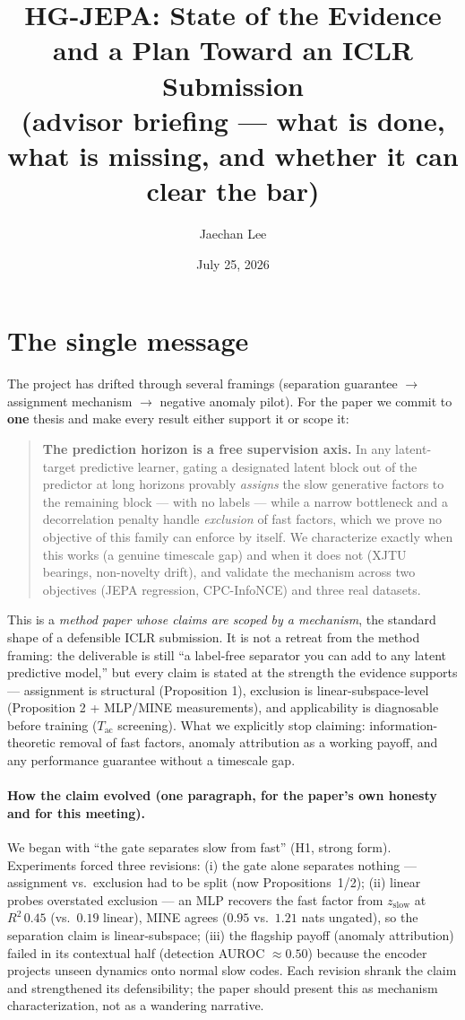 \documentclass[10pt]{article}
\title{\vspace{-8mm}\large\bf HG-JEPA: State of the Evidence and a Plan Toward an
ICLR Submission\\ \normalsize (advisor briefing --- what is done, what is missing,
and whether it can clear the bar)}
\author{Jaechan Lee}
\date{July 25, 2026}
\newcommand{\zslow}{z_{\mathrm{slow}}}
\begin{document}
\maketitle
\vspace{-6mm}

\section{The single message}
The project has drifted through several framings (separation guarantee
$\to$ assignment mechanism $\to$ negative anomaly pilot). For the paper we
commit to \textbf{one} thesis and make every result either support it or
scope it:

\begin{quote}
\textbf{The prediction horizon is a free supervision axis.} In any
latent-target predictive learner, gating a designated latent block out of the
predictor at long horizons provably \emph{assigns} the slow generative
factors to the remaining block --- with no labels --- while a narrow
bottleneck and a decorrelation penalty handle \emph{exclusion} of fast
factors, which we prove no objective of this family can enforce by itself. We
characterize exactly when this works (a genuine timescale gap) and when it
does not (XJTU bearings, non-novelty drift), and validate the mechanism
across two objectives (JEPA regression, CPC-InfoNCE) and three real datasets.
\end{quote}

This is a \emph{method paper whose claims are scoped by a mechanism}, the
standard shape of a defensible ICLR submission. It is not a retreat from the
method framing: the deliverable is still ``a label-free separator you can add
to any latent predictive model,'' but every claim is stated at the strength
the evidence supports --- assignment is structural (Proposition 1), exclusion
is linear-subspace-level (Proposition 2 + MLP/MINE measurements), and
applicability is diagnosable before training ($T_{\mathrm{ac}}$ screening).
What we explicitly stop claiming: information-theoretic removal of fast
factors, anomaly attribution as a working payoff, and any performance
guarantee without a timescale gap.

\paragraph{How the claim evolved (one paragraph, for the paper's own honesty
and for this meeting).} We began with ``the gate separates slow from fast''
(H1, strong form). Experiments forced three revisions: (i) the gate alone
separates nothing --- assignment vs.\ exclusion had to be split (now
Propositions~1/2); (ii) linear probes overstated exclusion --- an MLP
recovers the fast factor from $\zslow$ at $R^2\,0.45$ (vs.\ $0.19$ linear),
MINE agrees ($0.95$ vs.\ $1.21$ nats ungated), so the separation claim is
linear-subspace; (iii) the flagship payoff (anomaly attribution) failed in
its contextual half (detection AUROC $\approx 0.50$) because the encoder
projects unseen dynamics onto normal slow codes. Each revision shrank the
claim and strengthened its defensibility; the paper should present this as
mechanism characterization, not as a wandering narrative.
\end{document}
